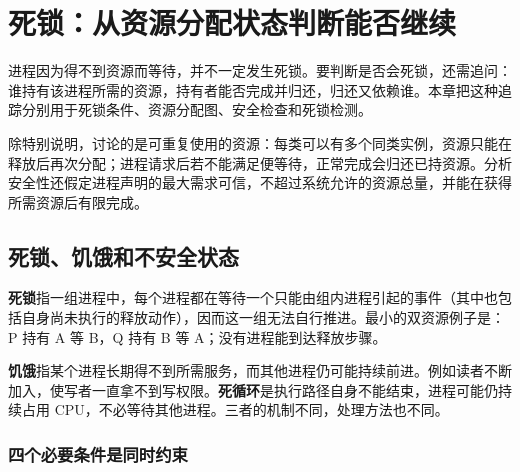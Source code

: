 \section{死锁：从资源分配状态判断能否继续}\label{OS02-module-04}

进程因为得不到资源而等待，并不一定发生死锁。要判断是否会死锁，还需追问：谁持有该进程所需的资源，持有者能否完成并归还，归还又依赖谁。本章把这种追踪分别用于死锁条件、资源分配图、安全检查和死锁检测。

除特别说明，讨论的是可重复使用的资源：每类可以有多个同类实例，资源只能在释放后再次分配；进程请求后若不能满足便等待，正常完成会归还已持资源。分析安全性还假定进程声明的最大需求可信，不超过系统允许的资源总量，并能在获得所需资源后有限完成。

\subsection{死锁、饥饿和不安全状态}\label{OS02-4-1}

\textbf{死锁}指一组进程中，每个进程都在等待一个只能由组内进程引起的事件（其中也包括自身尚未执行的释放动作），因而这一组无法自行推进。最小的双资源例子是：P 持有 A 等 B，Q 持有 B 等 A；没有进程能到达释放步骤。

\textbf{饥饿}指某个进程长期得不到所需服务，而其他进程仍可能持续前进。例如读者不断加入，使写者一直拿不到写权限。\textbf{死循环}是执行路径自身不能结束，进程可能仍持续占用 CPU，不必等待其他进程。三者的机制不同，处理方法也不同。

\subsubsection{四个必要条件是同时约束}\label{OS02-auto-23}

